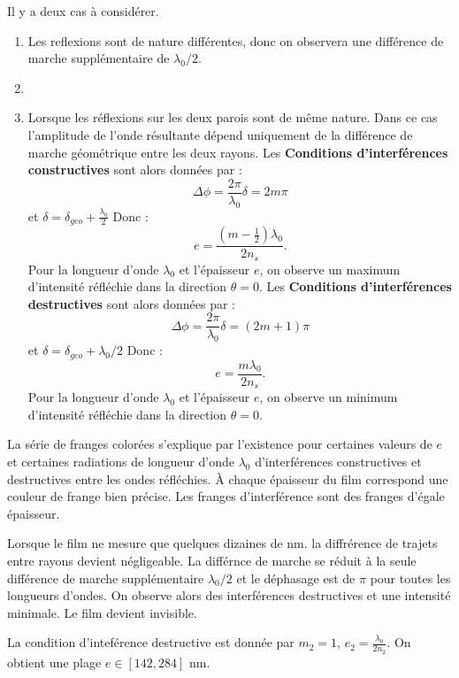 \documentclass[french]{article}
\begin{document}
Il y a deux cas à considérer.
\begin{enumerate}
	\item Les reflexions sont de nature différentes, donc on observera une différence de marche supplémentaire de $\lambda_0/2$.
	\item \item Lorsque les réflexions sur les deux parois sont de même nature. Dans ce cas l'amplitude de l'onde résultante dépend uniquement de la différence de marche géométrique entre les deux rayons. Les \textbf{Conditions d'interférences constructives} sont alors données par : \[\Delta\phi = \frac{2\pi}{\lambda_0}\delta = 2m\pi\] et $\delta = \delta_{geo}+\frac{\lambda_0}{2}$ Donc : 
	\begin{equation}
		e = \frac{\left(m-\frac{1}{2}\right)\lambda_0}{2n_s}.
	\end{equation} Pour la longueur d'onde $\lambda_0$ et l'épaisseur $e$, on observe un maximum d'intensité réfléchie dans la direction $\theta = 0$. Les \textbf{Conditions d'interférences destructives} sont alors données par : \[\Delta\phi = \frac{2\pi}{\lambda_0}\delta = (2m+1)\pi\] et $\delta = \delta_{geo}+\lambda_0/2$ Donc : 
	\begin{equation}
		e = \frac{m\lambda_0}{2n_s}.
	\end{equation} Pour la longueur d'onde $\lambda_0$ et l'épaisseur $e$, on observe un minimum d'intensité réfléchie dans la direction $\theta = 0$.
\end{enumerate}

La série de franges colorées s'explique par l'existence pour certaines valeurs de $e$ et certaines radiations de longueur d'onde $\lambda_0$ d'interférences constructives et destructives entre les ondes réfléchies. À chaque épaisseur du film correspond une couleur de frange bien précise.  Les franges d'interférence sont des franges d'égale épaisseur.\vspace{.5cm}

Lorsque le film ne mesure que quelques dizaines de nm. la diffrérence de trajets entre rayons devient négligeable. La différnce de marche se réduit à la seule différence de marche supplémentaire $\lambda_0/2$ et le déphasage est de $\pi$ pour toutes les longueurs d'ondes. On observe alors des interférences destructives et une intensité minimale. Le film devient invisible.


La condition d'inteférence destructive est donnée par $m_2 = 1$, $e_2 = \frac{\lambda_0}{2n_2}$. On obtient une plage $e\in[142, 284]$ nm. 
\end{document}
